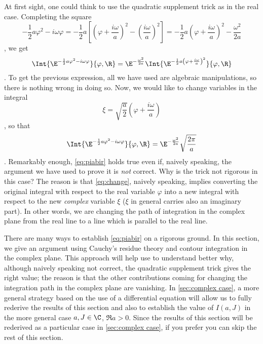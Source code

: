 At first sight,  one could think to use the quadratic supplement trick as in the
real case.
Completing the square 
\begin{dmath*}[compact]
   -\frac{1}{2}a\varphi^{2} - i\omega \varphi =
   -\frac{1}{2}a \left[  \left( \varphi + \frac{i\omega }{a} \right)^{2} - \left(
	 \frac{i\omega}{a} \right)^{2} \right]
   = -\frac{1}{2}a \left( \varphi + \frac{i\omega}{a} \right)^{2} -
   \frac{\omega^{2}}{2a} 
\end{dmath*},
we get
\begin{dmath*}%
   \Int{\E^{-\frac{1}{2}a\varphi^{2} - i\omega \varphi}}{\varphi, \R} =
   \E^{-\frac{\omega^{2}}{2a}} \Int{\E^{-\frac{1}{2}a \left( \varphi +
	 \frac{i\omega}{a} \right)^{2}}}{\varphi, \R}
\end{dmath*}.
To get the previous expression, all we have used are algebraic manipulations,
so there is nothing wrong in doing so.
Now, we would like to change variables in the integral
\begin{dmath}[label={change}]
   \xi = \sqrt{\frac{a}{2}} \left( \varphi + \frac{i\omega}{a} \right) 
\end{dmath},
so that 
\begin{dmath}[label={piabir}]
   \Int{\E^{-\frac{1}{2}a\varphi^{2} -i\omega \varphi}}{\varphi, \R} =
\E^{-\frac{\omega^{2}}{2a}} \sqrt{\frac{2\pi}{a}}
\end{dmath}.
Remarkably enough, \cref{eq:piabir} holds true even if, naively speaking, the
argument we have used to prove it is \emph{not} correct. Why is the trick not
rigorous in this case? The reason is that \cref{eq:change}, naively speaking, implies converting the
original integral with respect to the real variable $\varphi$ into a new
integral with respect to the new \emph{complex} variable $\xi$ ($\xi$ in general
carries also an imaginary part). In other words, we are changing the path of
integration in the complex plane from the real line to a line which is parallel
to the real line. 


There are many ways to establish \cref{eq:piabir} on a rigorous ground.
In this section, we give an argument using Cauchy's residue theory and contour
integration in the complex plane. This approach will help use to understand
better why, although naively speaking not correct, the quadratic supplement
trick gives the right value; the reason is that the other contributions coming
for changing the integration path in the complex plane are vanishing. In
\cref{sec:complex case}, a more general strategy based on the use of a
differential equation will allow us to fully rederive the results of this
section and also to establish the value of $I(a,J)$ in the more general case
$a,J\in\C$, $\Re a >0$. Since the results of this section will be rederived as
a particular case in \cref{sec:complex case}, if you prefer you can skip the
rest of this section.

